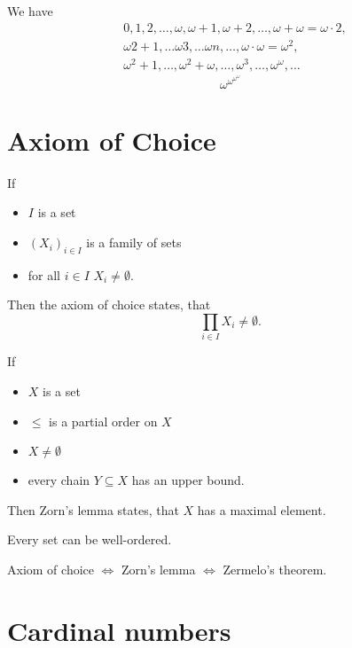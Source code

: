 \begin{remark}
    We have 
    \begin{align*}
        &0,1,2,\ldots,\omega,\omega+1,\omega+2,\ldots,\omega+\omega= \omega\cdot 2, \\
        &\omega 2 + 1, \ldots \omega 3, \ldots \omega n, \ldots, \omega \cdot \omega= \omega^2,\\
        &\omega^2 + 1, \ldots, \omega^2 + \omega, \ldots, \omega^3, \ldots, \omega^\omega, \ldots
    \end{align*}
    $$ \omega^{\omega^{\omega^\omega}}$$
\end{remark}

\section{Axiom of Choice}
\begin{recall}
    If 
    \begin{itemize}
        \item $I$ is a set
        \item $(X_i)_{i\in I}$ is a family of sets
        \item for all $i \in I$ $X_i \ne \emptyset$.
    \end{itemize}
    Then the axiom of choice states, that
    $$ \prod_{i \in I} X_i \ne \emptyset.$$
\end{recall}

\begin{recall}
    If 
    \begin{itemize}
        \item $X$ is a set
        \item $\leq$ is a partial order on $X$
        \item $X \ne \emptyset$
        \item every chain $Y \subseteq X$ has an upper bound.
    \end{itemize}
    Then Zorn's lemma states, that $X$ has a maximal element.
\end{recall}

\begin{recall}
    Every set can be well-ordered.
\end{recall}

\begin{recall}
    Axiom of choice $\iff$ Zorn's lemma $\iff$ Zermelo's theorem.
\end{recall}

\section{Cardinal numbers}

